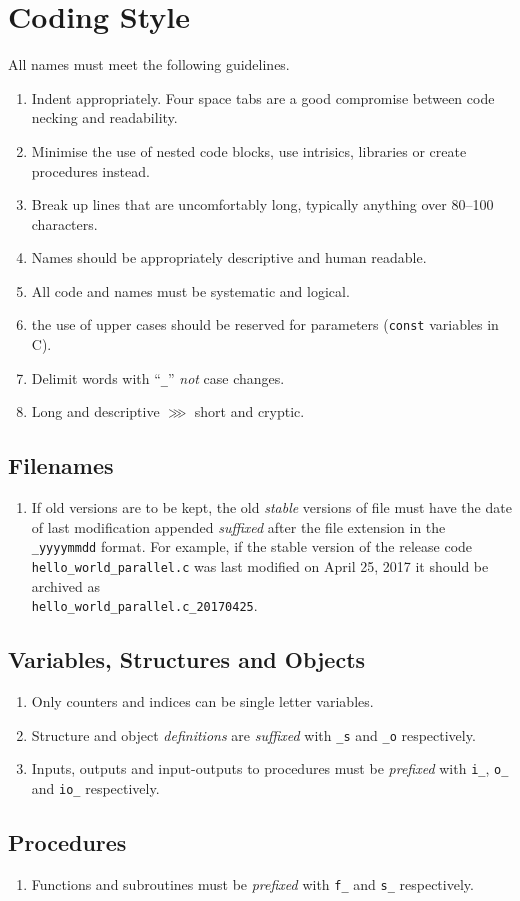 	\section{Coding Style}\label{c:best_practices:s:naming_conventions}
		All names must meet the following guidelines.
		\begin{enumerate}
			\item Indent appropriately. Four space tabs are a good compromise between code necking and readability.
			\item Minimise the use of nested code blocks, use intrisics, libraries or create procedures instead.
			\item Break up lines that are uncomfortably long, typically anything over 80--100 characters.
			\item Names should be appropriately descriptive and human readable.
			\item All code and names must be systematic and logical.
			\item the use of upper cases should be reserved for parameters (\texttt{const} variables in C).
			\item Delimit words with ``\texttt{\_}'' \emph{not} case changes.
			\item Long and descriptive $\ggg$ short and cryptic.
		\end{enumerate}
		\subsection{Filenames}\label{c:best_practices:s:naming_conventions:ss:filenames}
			\begin{enumerate}
				\item If old versions are to be kept, the old \emph{stable} versions of file must have the date of last modification appended \emph{suffixed} after the file extension in the \texttt{\_yyyymmdd} format. For example, if the stable version of the release code \texttt{hello\_world\_parallel.c} was last modified on April 25, 2017 it should be archived as\\ \texttt{hello\_world\_parallel.c\_20170425}.
			\end{enumerate}
		\subsection{Variables, Structures and Objects}\label{c:best_practices:s:naming_conventions:ss:variables_structures_objects}
			\begin{enumerate}
				\item Only counters and indices can be single letter variables.
				\item Structure and object \emph{definitions} are \emph{suffixed} with \texttt{\_s} and \texttt{\_o} respectively.
				\item Inputs, outputs and input-outputs to procedures must be \emph{prefixed} with \texttt{i\_}, \texttt{o\_} and \texttt{io\_} respectively.
			\end{enumerate}
		\subsection{Procedures}\label{c:best_practices:s:naming_conventions:ss:procedures}
			\begin{enumerate}
				\item Functions and subroutines must be \emph{prefixed} with \texttt{f\_} and \texttt{s\_} respectively.
			\end{enumerate}